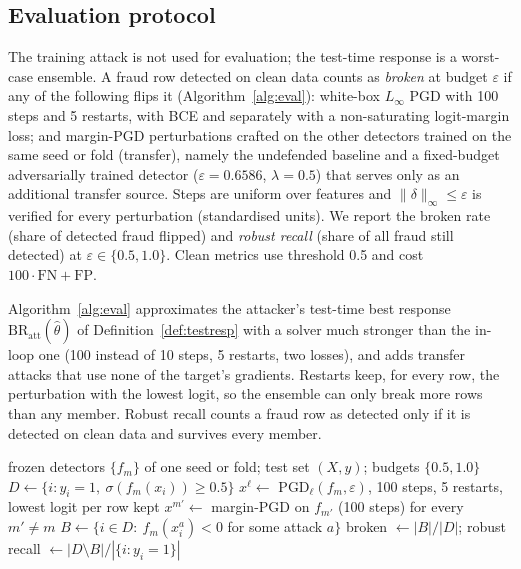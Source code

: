\documentclass[conference]{IEEEtran}
\newcommand{\BR}{\mathrm{BR}}
\begin{document}
\subsection{Evaluation protocol}\label{sec:evalA}
The training attack is not used for evaluation; the test-time response is a worst-case ensemble. A fraud row detected on clean data counts as \emph{broken} at budget $\varepsilon$ if any of the following flips it (Algorithm~\ref{alg:eval}): white-box $L_\infty$ PGD with 100 steps and 5 restarts, with BCE and separately with a non-saturating logit-margin loss; and margin-PGD perturbations crafted on the other detectors trained on the same seed or fold (transfer), namely the undefended baseline and a fixed-budget adversarially trained detector ($\varepsilon{=}0.6586$, $\lambda{=}0.5$) that serves only as an additional transfer source. Steps are uniform over features and $\|\delta\|_\infty\le\varepsilon$ is verified for every perturbation (standardised units). We report the broken rate (share of detected fraud flipped) and \emph{robust recall} (share of all fraud still detected) at $\varepsilon\in\{0.5,1.0\}$. Clean metrics use threshold 0.5 and cost $100\cdot\mathrm{FN}+\mathrm{FP}$.

Algorithm~\ref{alg:eval} approximates the attacker's test-time best response $\BR_{\mathrm{att}}(\hat\theta)$ of Definition~\ref{def:testresp} with a solver much stronger than the in-loop one (100 instead of 10 steps, 5 restarts, two losses), and adds transfer attacks that use none of the target's gradients. Restarts keep, for every row, the perturbation with the lowest logit, so the ensemble can only break more rows than any member. Robust recall counts a fraud row as detected only if it is detected on clean data and survives every member.

\begin{algorithm}[t]
\caption{Worst-case test-time response (Study~A)}\label{alg:eval}
\small
\begin{algorithmic}[1]
\Require frozen detectors $\{f_m\}$ of one seed or fold; test set $(X,y)$; budgets $\{0.5,1.0\}$
  \State $D\gets\{i:y_i=1,\ \sigma(f_m(x_i))\ge0.5\}$ 
     
      \State $x^{\ell}\gets$ PGD$_\ell(f_m,\varepsilon)$, 100 steps, 5 restarts, lowest logit per row kept
    \EndFor
    \State $x^{m'}\gets$ margin-PGD on $f_{m'}$ (100 steps) for every $m'\ne m$ 
    \State $B\gets\{i\in D:\ f_m(x^{a}_i)<0$ for some attack $a\}$
    \State broken $\gets|B|/|D|$; robust recall $\gets|D\setminus B|/|\{i:y_i=1\}|$
  \EndFor
\EndFor
\end{algorithmic}
\end{algorithm}
\end{document}
